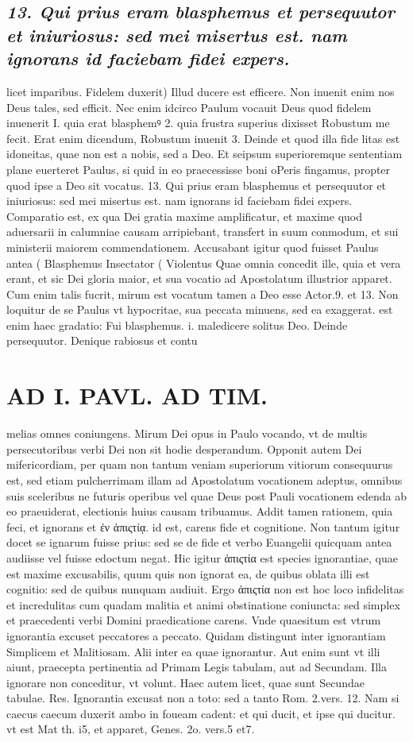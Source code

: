 \documentclass{article}
\begin{document}
\begin{pages}
\subsection*{\textit{13. Qui prius eram blasphemus et persequutor et iniuriosus: sed mei misertus est. nam ignorans id faciebam fidei expers.}}licet imparibus. Fidelem duxerit) Illud ducere est efficere. Non inuenit enim nos Deus tales, sed efficit. Nec enim idcirco Paulum vocauit Deus quod fidelem inuenerit I. quia erat blasphemꝰ 2. quia frustra superius dixisset Robustum me fecit. Erat enim dicendum, Robustum inuenit 3. Deinde et quod illa fide litas est idoneitas, quae non est a nobis, sed a Deo. Et seipsum superioremque sententiam plane euerteret Paulus, si quid in eo praecessisse boni oPeris fingamus, propter quod ipse a Deo sit vocatus. 13. Qui prius eram blasphemus et persequutor et iniuriosus: sed mei misertus est. nam ignorans id faciebam fidei expers. Comparatio est, ex qua Dei gratia maxime amplificatur, et maxime quod aduersarii in calumniae causam arripiebant, transfert in suum conmodum, et sui ministerii maiorem commendationem. Accusabant igitur quod fuisset Paulus antea ( Blasphemus Insectator ( Violentus Quae omnia concedit ille, quia et vera erant, et sic Dei gloria maior, et sua vocatio ad Apostolatum illustrior apparet. Cum enim talis fucrit, mirum est vocatum tamen a Deo esse Actor.9. et 13. Non loquitur de se Paulus vt hypocritae, sua peccata minuens, sed ea exaggerat. est enim haec gradatio: Fui blasphemus. i. maledicere solitus Deo. Deinde persequutor. Denique rabiosus et contu\pend
\section*{AD I. PAVL. AD TIM. }
\marginpar{[ p.26 ]}\pstart melias omnes coniungens. Mirum Dei opus in Paulo vocando, vt de multis persecutoribus verbi Dei non sit hodie desperandum. Opponit autem Dei mifericordiam, per quam non tantum veniam superiorum vitiorum consequurus est, sed etiam pulcherrimam illam ad Apostolatum vocationem adeptus, omnibus suis sceleribus ne futuris operibus vel quae Deus post Pauli vocationem edenda ab eo praeuiderat, electionis huius causam tribuamus. Addit tamen rationem, quia feci, et ignorans et ἐν ἀπιςτίᾳ. id est, carens fide et cognitione. Non tantum igitur docet se ignarum fuisse prius: sed se de fide et verbo Euangelii quicquam antea audiisse vel fuisse edoctum negat. Hic igitur ἀπιςτία est species ignorantiae, quae est maxime excusabilis, quum quis non ignorat ea, de quibus oblata illi est cognitio: sed de quibus nunquam audiuit. Ergo ἀπιςτία non est hoc loco infidelitas et incredulitas cum quadam malitia et animi obstinatione coniuncta: sed simplex et praecedenti verbi Domini praedicatione carens. Vnde quaesitum est vtrum ignorantia excuset peccatores a peccato. Quidam distingunt inter ignorantiam Simplicem et Malitiosam. Alii inter ea quae ignorantur. Aut enim sunt vt illi aiunt, praecepta pertinentia ad Primam Legis tabulam, aut ad Secundam. Illa ignorare non conceditur, vt volunt. Haec autem licet, quae sunt Secundae tabulae. Res. Ignorantia excusat non a toto: sed a tanto Rom. 2.vers. 12. Nam si caecus caecum duxerit ambo in foueam cadent: et qui ducit, et ipse qui ducitur. vt est Mat th. i5, et apparet, Genes. 2o. vers.5 et7.  \pend

\end{pages}
\end{document}
